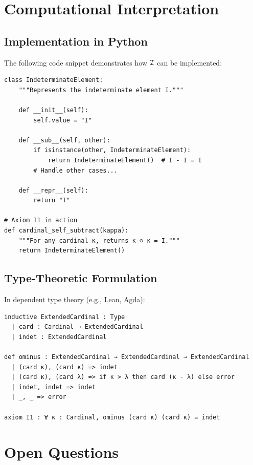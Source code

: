 \section{Computational Interpretation}

\subsection{Implementation in Python}

The following code snippet demonstrates how $\mathcal{I}$ can be implemented:

\begin{verbatim}
class IndeterminateElement:
    """Represents the indeterminate element I."""
    
    def __init__(self):
        self.value = "I"
    
    def __sub__(self, other):
        if isinstance(other, IndeterminateElement):
            return IndeterminateElement()  # I - I = I
        # Handle other cases...
    
    def __repr__(self):
        return "I"

# Axiom I1 in action
def cardinal_self_subtract(kappa):
    """For any cardinal κ, returns κ ⊖ κ = I."""
    return IndeterminateElement()
\end{verbatim}

\subsection{Type-Theoretic Formulation}

In dependent type theory (e.g., Lean, Agda):

\begin{verbatim}
inductive ExtendedCardinal : Type
  | card : Cardinal → ExtendedCardinal
  | indet : ExtendedCardinal

def ominus : ExtendedCardinal → ExtendedCardinal → ExtendedCardinal
  | (card κ), (card κ) => indet
  | (card κ), (card λ) => if κ > λ then card (κ - λ) else error
  | indet, indet => indet
  | _, _ => error

axiom I1 : ∀ κ : Cardinal, ominus (card κ) (card κ) = indet
\end{verbatim}

\section{Open Questions}

